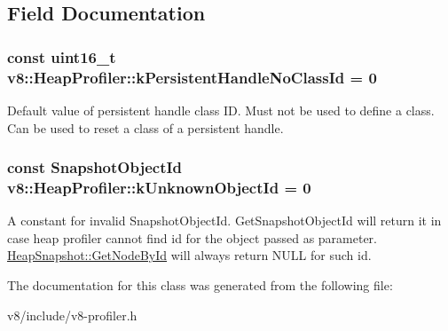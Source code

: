 \subsection{Field Documentation}
\hypertarget{classv8_1_1HeapProfiler_a272c9af3ea5cd90a2737af3d22a7eb78}{
\subsubsection[{k\-Persistent\-Handle\-No\-Class\-Id}]{\setlength{\rightskip}{0pt plus 5cm}const uint16\-\_\-t v8\-::\-Heap\-Profiler\-::k\-Persistent\-Handle\-No\-Class\-Id = 0\hspace{0.3cm}{\ttfamily [static]}}}\label{classv8_1_1HeapProfiler_a272c9af3ea5cd90a2737af3d22a7eb78}
Default value of persistent handle class I\-D. Must not be used to define a class. Can be used to reset a class of a persistent handle. \hypertarget{classv8_1_1HeapProfiler_abf2b9d8facb18473f9b124ab8baf5786}{
\subsubsection[{k\-Unknown\-Object\-Id}]{\setlength{\rightskip}{0pt plus 5cm}const Snapshot\-Object\-Id v8\-::\-Heap\-Profiler\-::k\-Unknown\-Object\-Id = 0\hspace{0.3cm}{\ttfamily [static]}}}\label{classv8_1_1HeapProfiler_abf2b9d8facb18473f9b124ab8baf5786}
A constant for invalid Snapshot\-Object\-Id. Get\-Snapshot\-Object\-Id will return it in case heap profiler cannot find id for the object passed as parameter. \hyperlink{classv8_1_1HeapSnapshot_a023696f94fe538380922bf2c40c97b7b}{Heap\-Snapshot\-::\-Get\-Node\-By\-Id} will always return N\-U\-L\-L for such id. 

The documentation for this class was generated from the following file\-:\begin{DoxyCompactItemize}
\item 
v8/include/v8-\/profiler.\-h\end{DoxyCompactItemize}
